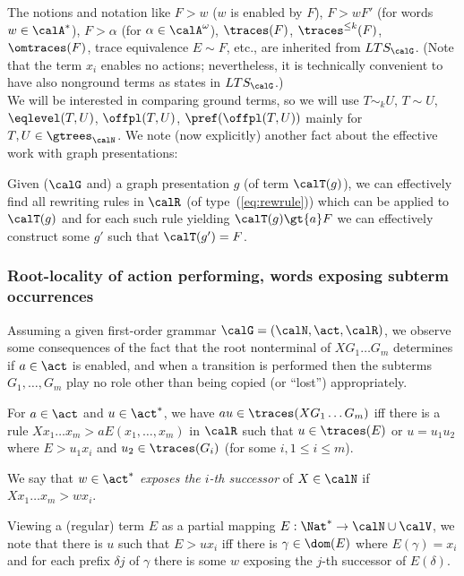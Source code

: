 \documentclass[12pt]{article}
\begin{document}
The notions and notation like $F\gt{w}$ ($w$ is enabled by $F$),
$F \gt{w} F'$ (for words $w \in \calA^{*}$), 
$F \gt{\alpha}$ (for $\alpha \in \calA^{\omega}$),
$\traces(F)$, $\traces^{\leq k}(F)$, $\omtraces(F)$,
trace equivalence $E\sim F$, etc.,
are inherited from $LTS_{\calG}$. 
(Note that the term $x_i$ enables no actions; nevertheless,
it is technically convenient to have also
nonground terms as states in  $LTS_{\calG}$.)
\\
We will be interested in comparing ground terms,
so we will use $T\sim_k U$, $T\sim U$, 
$\eqlevel(T,U)$, $\offpl(T,U)$, $\pref(\offpl(T,U))$
mainly for
$T,U\in\gtrees_{\calN}$.
We note (now explicitly)
another fact about the effective work with graph presentations:

\begin{observ}
Given ($\calG$ and) a graph presentation $g$ (of term $\calT(g)$), we can effectively 
find all rewriting rules in $\calR$ (of type~(\ref{eq:rewrule})) which
can be applied to $\calT(g)$ and for each such rule yielding 
$\calT(g)\gt{a}F$ we can effectively construct some $g'$ such that $\calT(g')=F$. 
\end{observ}


\subsubsection*{Root-locality of action performing, 
words exposing subterm occurrences}

Assuming a given first-order grammar $\calG=(\calN,\act,\calR)$,
we observe some consequences of
the fact that the root nonterminal of $XG_1\dots G_m$ 
determines if $a\in\act$ is enabled, and when a transition is performed
then the subterms $G_1,\dots,G_m$ play no role other than being copied
(or ``lost'')
appropriately.



\begin{observ}\label{prop:basictraceperform}
For  $a\in\act$ and  $u\in\act^*$,  
we have $au\in \traces(XG_1\dots G_m)$ iff 
there is a rule $Xx_1\dots x_m\gt{a}E(x_1,\dots,x_m)$ in
$\calR$ such that $u\in\traces(E)$ or $u=u_1u_2$ where 
$E\gt{u_1}x_i$ and $u_2\in\traces(G_i)$ (for some $i,1\leq i\leq m$).
\end{observ}
We say that 
$w\in\act^*$ \emph{exposes the $i$-th successor} of $X\in\calN$
if  $Xx_1\dots x_m\gt{w}x_i$.

\begin{observ}\label{prop:basicsubtermexpos}
Viewing a (regular) term $E$ as a partial mapping
$E:\Nat^*\rightarrow \calN\cup \calV$, we note that there is $u$ such that 
$E\gt{u}x_i$ iff there is $\gamma\in\dom(E)$ where $E(\gamma)=x_i$ and
for each  prefix $\delta j$ of
$\gamma$ there is some $w$ exposing the $j$-th successor of
$E(\delta)$. 
\end{observ}
\end{document}
